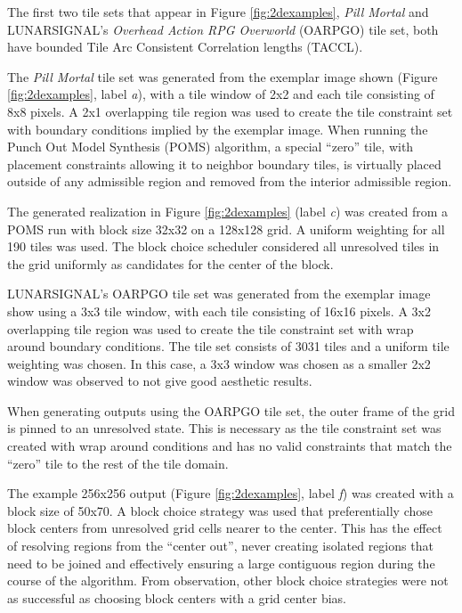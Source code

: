 The first two tile sets that appear in Figure \ref{fig:2dexamples}, \textit{Pill Mortal} and LUNARSIGNAL's \textit{Overhead Action RPG Overworld}
(OARPGO) tile set, both
have bounded Tile Arc Consistent Correlation lengths (TACCL).

The \textit{Pill Mortal} tile set was generated from the exemplar image shown (Figure \ref{fig:2dexamples}, label \textit{a}), with a tile window of 2x2
and each tile consisting of 8x8 pixels.
A 2x1 overlapping tile region was used to create the tile constraint set with boundary conditions implied by the exemplar image.
When running the Punch Out Model Synthesis (POMS) algorithm, a special ``zero'' tile,
  with placement constraints allowing it to neighbor boundary tiles,
is virtually placed outside of any admissible region and removed from the interior admissible region.

The generated realization in Figure \ref{fig:2dexamples} (label \textit{c}) was created from a POMS run with block size 32x32 on a 128x128 grid.
A uniform weighting for all 190 tiles was used.
The block choice scheduler considered all unresolved tiles in the grid uniformly as candidates for the center of the block.

LUNARSIGNAL's OARPGO tile set was generated from the exemplar image show using a 3x3 tile window, with each tile consisting
of 16x16 pixels.
A 3x2 overlapping tile region was used to create the tile constraint set with wrap around boundary conditions.
The tile set consists of 3031 tiles and a uniform tile weighting was chosen.
In this case, a 3x3 window was chosen as a smaller 2x2 window was observed to not give good aesthetic results.

When generating outputs using the OARPGO tile set, the outer frame of the grid is pinned to an unresolved state.
This is necessary as the tile constraint set was created with wrap around conditions and has no valid constraints that match the ``zero'' tile
to the rest of the tile domain.

The example 256x256 output (Figure \ref{fig:2dexamples}, label \textit{f})
was created with a block size of 50x70.
A block choice strategy was used that preferentially chose block centers from unresolved grid cells
nearer to the center.
This has the effect of resolving regions from the ``center out'', never creating isolated regions that need to be joined and effectively
  ensuring a large contiguous region during the course of the algorithm.
From observation, other block choice strategies were not as successful as choosing block centers with a grid center bias.

